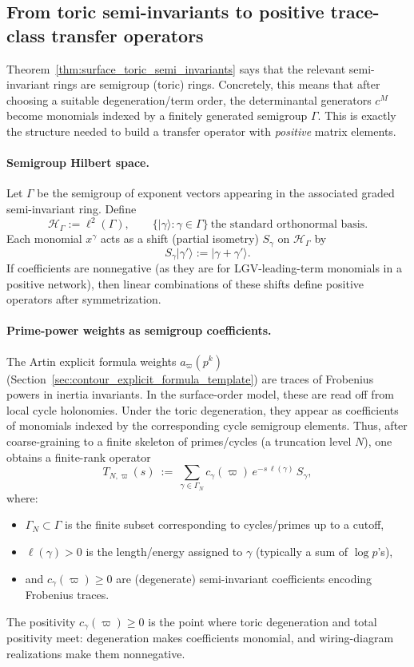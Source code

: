 \documentclass[11pt,oneside]{amsbook}
\numberwithin{equation}{section}
\theoremstyle{plain}
\theoremstyle{definition}
\theoremstyle{remark}
\newcommand{\ket}[1]{\lvert #1 \rangle}
\begin{document}
\subsection{From toric semi-invariants to positive trace-class transfer operators}
\label{sec:toric_to_transfer_operator}

Theorem~\ref{thm:surface_toric_semi_invariants} says that the relevant semi-invariant rings are semigroup (toric) rings.
Concretely, this means that after choosing a suitable degeneration/term order, the determinantal generators $c^M$ become monomials indexed by a finitely generated semigroup $\Gamma$.
This is exactly the structure needed to build a transfer operator with \emph{positive} matrix elements.

\paragraph{Semigroup Hilbert space.}
Let $\Gamma$ be the semigroup of exponent vectors appearing in the associated graded semi-invariant ring.
Define
\[
\mathcal{H}_\Gamma:=\ell^2(\Gamma),
\qquad
\{\ket{\gamma}:\gamma\in\Gamma\}\ \text{the standard orthonormal basis.}
\]
Each monomial $x^\gamma$ acts as a shift (partial isometry) $S_\gamma$ on $\mathcal{H}_\Gamma$ by
\[
S_\gamma\ket{\gamma'}:=\ket{\gamma+\gamma'}.
\]
If coefficients are nonnegative (as they are for LGV-leading-term monomials in a positive network), then linear combinations of these shifts define positive operators after symmetrization.

\paragraph{Prime-power weights as semigroup coefficients.}
The Artin explicit formula weights $a_\varpi(p^k)$ (Section~\ref{sec:contour_explicit_formula_template}) are traces of Frobenius powers in inertia invariants.
In the surface-order model, these are read off from local cycle holonomies.
Under the toric degeneration, they appear as coefficients of monomials indexed by the corresponding cycle semigroup elements.
Thus, after coarse-graining to a finite skeleton of primes/cycles (a truncation level $N$),
one obtains a finite-rank operator
\begin{equation}
\label{eq:transfer_operator_semigroup_form}
T_{N,\varpi}(s)\ :=\ \sum_{\gamma\in \Gamma_N} c_\gamma(\varpi)\,e^{-s\,\ell(\gamma)}\,S_\gamma,
\end{equation}
where:
\begin{itemize}
\item $\Gamma_N\subset\Gamma$ is the finite subset corresponding to cycles/primes up to a cutoff,
\item $\ell(\gamma)>0$ is the length/energy assigned to $\gamma$ (typically a sum of $\log p$'s),
\item and $c_\gamma(\varpi)\ge 0$ are (degenerate) semi-invariant coefficients encoding Frobenius traces.
\end{itemize}
The positivity $c_\gamma(\varpi)\ge 0$ is the point where toric degeneration and total positivity meet:
degeneration makes coefficients monomial, and wiring-diagram realizations make them nonnegative.
\end{document}
